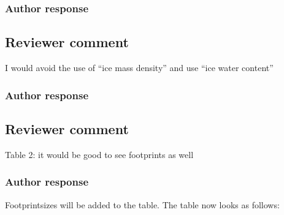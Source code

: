 \documentclass[11pt]{scrartcl}
\begin{document}
\subsubsection*{Author response}

\subsection*{Reviewer comment}
I would avoid the use of “ice mass density” and use “ice water content”

\subsubsection*{Author response}

\subsection*{Reviewer comment}
Table 2:  it would be good to see footprints as well

\subsubsection*{Author response}
Footprintsizes will be added to the table. The table now looks as follows:
\end{document}
